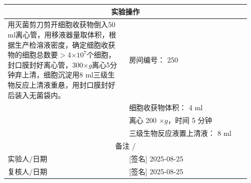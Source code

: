 \documentclass[UTF8,10pt,a4paper,fontset=fandol]{ctexart}
\newcommand{\fieldvalue}[1]{#1}
\newcommand{\handwritten}[1]{#1}
\begin{document}
\begin{center}
\begin{tabular}{|p{0.47\linewidth}|p{0.47\linewidth}|}
\hline
\multicolumn{2}{|c|}{实验操作}\\
\hline
用灭菌剪刀剪开细胞收获物倒入50 ml离心管，用移液器量取体积，根据生产检溶液密度，确定细胞收获物的细胞总数要$>$4$\times10^{7}$个细胞，封口膜封好离心管，300$\times g$离心5分钟弃上清，细胞沉淀用8 ml三级生物反应上清液重悬，用封口膜封好后装入无菌袋内。 &
房间编号：
\fieldvalue{\handwritten{250}}\\
&
细胞收获物体积：
\fieldvalue{\handwritten{4}} ml\\
&
离心
\fieldvalue{\handwritten{200}} $\times g$，时间
\fieldvalue{\handwritten{5}} 分钟\\
&
三级生物反应液置上清液：
\fieldvalue{\handwritten{8}} ml\\
\hline
\multicolumn{2}{|c|}{备注\quad
\fieldvalue{\handwritten{/}}}\\
\hline
实验人/日期 &
\fieldvalue{\handwritten{[签名]}}
\quad
\fieldvalue{\handwritten{2025-08-25}}\\
\hline
复核人/日期 &
\fieldvalue{\handwritten{[签名]}}
\quad
\fieldvalue{\handwritten{2025-08-25}}\\
\hline
\end{tabular}
\end{center}
\end{document}
